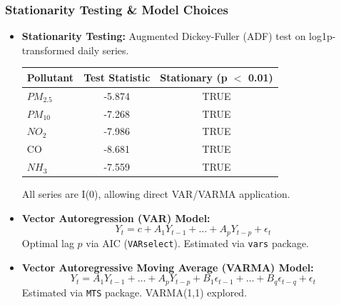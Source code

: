\documentclass[svgnames, 12pt]{beamer}
\begin{document}
\begin{frame}
    \frametitle{Stationarity Testing & Model Choices}
    \begin{itemize}
        \item \textbf{Stationarity Testing:} Augmented Dickey-Fuller (ADF) test on log1p-transformed daily series.
            \begin{center}
            \footnotesize
            \begin{tabular}{lcc}
                \toprule
                Pollutant & Test Statistic & Stationary (p $<$ 0.01) \\
                \midrule
                $PM_{2.5}$ & -5.874 & TRUE \\
                $PM_{10}$  & -7.268 & TRUE \\
                $NO_2$     & -7.986 & TRUE \\
                CO         & -8.681 & TRUE \\
                $NH_3$     & -7.559 & TRUE \\
                \bottomrule
            \end{tabular}
            \end{center}
            \vspace{0.2cm}
            \rightarrow All series are I(0), allowing direct VAR/VARMA application.

        \item \textbf{Vector Autoregression (VAR) Model:}
            $$ Y_t = c + A_1 Y_{t-1} + \dots + A_p Y_{t-p} + \epsilon_t $$
            Optimal lag $p$ via AIC (\texttt{VARselect}). Estimated via \texttt{vars} package.

        \item \textbf{Vector Autoregressive Moving Average (VARMA) Model:}
            $$ Y_t = A_1 Y_{t-1} + \dots + A_p Y_{t-p} + B_1 \epsilon_{t-1} + \dots + B_q \epsilon_{t-q} + \epsilon_t $$
            Estimated via \texttt{MTS} package. VARMA(1,1) explored.
    \end{itemize}
\end{frame}

\end{document}
